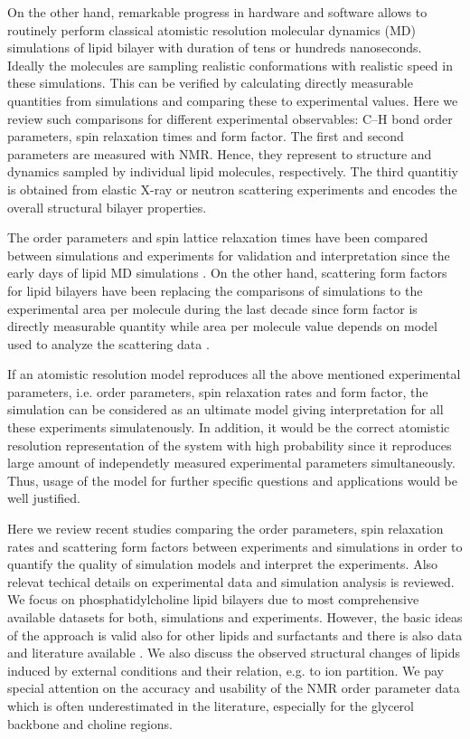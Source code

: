 \documentclass[aps,prl,superscriptaddress,twocolumn]{revtex4}
\begin{document}
On the other hand, remarkable progress in hardware and software allows to 
routinely perform classical atomistic resolution molecular dynamics (MD) simulations of lipid bilayer with 
duration of tens or hundreds nanoseconds. Ideally the molecules are sampling realistic
conformations with realistic speed in these simulations. This can be verified by calculating
directly measurable quantities from simulations and comparing these to experimental values.
Here we review such comparisons for different experimental observables: C--H bond order parameters,
spin relaxation times and form factor. The first and second parameters are measured with NMR. Hence, they 
represent to structure and dynamics sampled by individual lipid molecules, respectively.
The third quantitiy is obtained from elastic X-ray or neutron scattering experiments and encodes the overall structural bilayer properties.

The order parameters and spin lattice relaxation times have been compared between simulations
and experiments for validation and interpretation since the early days of lipid MD simulations \cite{ploeg82,pastor88}.
On the other hand, scattering form factors for lipid bilayers have been replacing the 
comparisons of simulations to the experimental area per molecule during the last decade
since form factor is directly measurable quantity while area per molecule value depends on
model used to analyze the scattering data \cite{nagle00}.

If an atomistic resolution model reproduces all the above mentioned experimental parameters,
i.e. order parameters, spin relaxation rates and form factor, the simulation can be considered
as an ultimate model giving interpretation for all these experiments simulatenously.
In addition, it would be the correct atomistic resolution representation of the system with high
probability since it reproduces large amount of independetly measured experimental parameters 
simultaneously. Thus, usage of the model for further specific questions and applications would be well justified.

Here we review recent studies comparing the order parameters, spin relaxation rates
and scattering form factors between experiments and simulations in order to quantify the quality
of simulation models and interpret the experiments. Also relevat techical details on experimental
data and simulation analysis is reviewed. We focus on phosphatidylcholine lipid
bilayers due to most comprehensive available datasets for both, simulations and experiments.
However, the basic ideas of the approach is valid also for other lipids and surfactants and there
is also data and literature available \cite{??}. We also discuss the observed structural changes of
lipids induced by external conditions and their relation, e.g. to ion partition. 
We pay special attention on the accuracy and usability of the NMR order parameter data which
is often underestimated in the literature, especially for the glycerol backbone and choline
regions.
 
\end{document}
